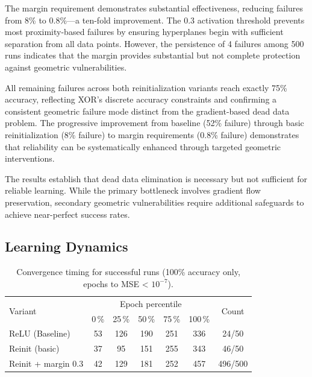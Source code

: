 The margin requirement demonstrates substantial effectiveness, reducing failures from 8\% to 0.8\%—a ten-fold improvement. The 0.3 activation threshold prevents most proximity-based failures by ensuring hyperplanes begin with sufficient separation from all data points. However, the persistence of 4 failures among 500 runs indicates that the margin provides substantial but not complete protection against geometric vulnerabilities.

All remaining failures across both reinitialization variants reach exactly 75\% accuracy, reflecting XOR's discrete accuracy constraints and confirming a consistent geometric failure mode distinct from the gradient-based dead data problem. The progressive improvement from baseline (52\% failure) through basic reinitialization (8\% failure) to margin requirements (0.8\% failure) demonstrates that reliability can be systematically enhanced through targeted geometric interventions.

The results establish that dead data elimination is necessary but not sufficient for reliable learning. While the primary bottleneck involves gradient flow preservation, secondary geometric vulnerabilities require additional safeguards to achieve near-perfect success rates.


\subsection*{Learning Dynamics}

\begin{table}[ht]
\centering
\caption{Convergence timing for successful runs (100\% accuracy only, epochs to MSE < $10^{-7}$).}
\label{tab:relu1-reinit-timing}
\begin{tabular}{lcccccc}
\toprule
\multirow{2}{*}{Variant} &
\multicolumn{5}{c}{Epoch percentile} & \multirow{2}{*}{Count} \\
\cmidrule(lr){2-6}
& 0\,\% & 25\,\% & 50\,\% & 75\,\% & 100\,\% & \\
\midrule
ReLU (Baseline) & 53 & 126 & 190 & 251 & 336 & 24/50 \\
Reinit (basic) & 37 & 95 & 151 & 255 & 343 & 46/50 \\
Reinit + margin 0.3 & 42 & 129 & 181 & 252 & 457 & 496/500 \\
\bottomrule
\end{tabular}
\end{table}

